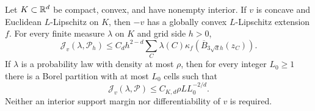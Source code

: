\begin{lemma}\label{lem:curvature}
Let $K\subset\mathbb R^d$ be compact, convex, and have nonempty interior. If $v$ is concave and Euclidean $L$-Lipschitz on $K$, then $-v$ has a globally convex $L$-Lipschitz extension $f$. For every finite measure $\lambda$ on $K$ and grid side $h>0$,
\begin{equation}\label{eq:curvbound}
 \mathcal J_v(\lambda,\mathcal P_h)
 \le C_d h^{2-d}\sum_C\lambda(C)
 \kappa_f(\overline B_{3\sqrt d h}(z_C)).
\end{equation}
If $\lambda$ is a probability law with density at most $\rho$, then for every integer $L_0\ge1$ there is a Borel partition with at most $L_0$ cells such that
\begin{equation}\label{eq:gridrate}
 \mathcal J_v(\lambda,\mathcal P)\le C_{K,d}\rho L L_0^{-2/d}.
\end{equation}
Neither an interior support margin nor differentiability of $v$ is required.
\end{lemma}
